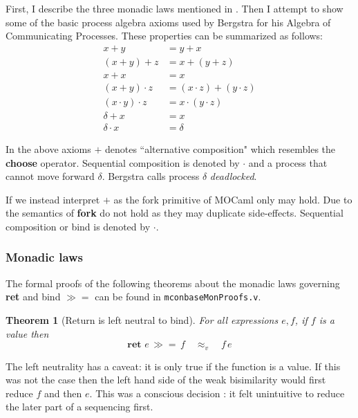 \documentclass[12pt,twoside,notitlepage]{report}
\theoremstyle{plain}%
\newtheorem{thm}{Theorem}[section]
\theoremstyle{definition}
\theoremstyle{remark}
\begin{document}
First, I describe the three monadic laws mentioned in . Then I attempt to show some of the basic process algebra axioms used by Bergstra for his Algebra of Communicating Processes\cite{bergstra1984process,bergstra1986algebra}. These properties can be summarized as follows:
\begin{align}
x + y &= y + x \tag{+ commutativity} \label{eq:fork_comm}\\
(x + y) + z &= x + (y + z) \tag{+ associativity} \label{eq:fork_assoc}\\
x + x &= x \tag{+ idempotence}\label{eq:choice_id}\\
(x + y)\cdot z &= (x \cdot z) + (y \cdot z) \tag{+ $ \cdot $ distributivity} \label{eq:fork_bind_distribute}\\
(x \cdot y)\cdot z &= x \cdot (y \cdot z) \tag{$\cdot$ associativity} \label{eq:bind_assoc}\\
\delta + x &= x \tag{+ deadlock}\label{eq:fork_deadlock} \\
\delta \cdot x &= \tag{$\cdot$ deadlock}\delta \label{eq:bind_deadlock}
\end{align}

In the above axioms $ + $ denotes ``alternative composition" which resembles the \textbf{choose} operator. Sequential composition is denoted by $ \cdot $ and a process that cannot move forward $ \delta $. Bergstra\cite{bergstra1984process} calls process $ \delta $ \textit{deadlocked}.

If we instead interpret $ + $ as the fork primitive of MOCaml only  may hold. Due to the semantics of \textbf{fork}  do not hold as they may duplicate side-effects. Sequential composition or bind is denoted by $ \cdot $.

\subsubsection{Monadic laws}
\label{sec:equivs}
The formal proofs of the following theorems about the monadic laws governing \textbf{ret} and bind $ \gg= $ can be found in \verb|mconbaseMonProofs.v|.

\begin{thm}[Return is left neutral to bind]
For all expressions $ e, f $, if $ f $ is a value then
\[ \textbf{ret } e\,\gg=\, f\quad \approx_v \quad f\,e \]
\end{thm}

The left neutrality has a caveat: it is only true if the function is a value. If this was not the case then the left hand side of the weak bisimilarity would first reduce $ f $ and then $ e $. This was a conscious decision : it felt unintuitive to reduce the later part of a sequencing first. 
\end{document}
